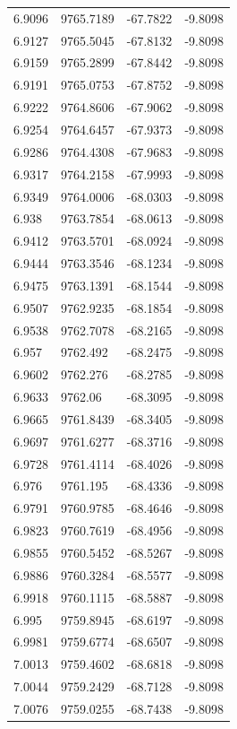 \begin{table}[H]
\begin{tabular}{llll}
6.9096 & 9765.7189 & -67.7822 & -9.8098 \\
6.9127 & 9765.5045 & -67.8132 & -9.8098 \\
6.9159 & 9765.2899 & -67.8442 & -9.8098 \\
6.9191 & 9765.0753 & -67.8752 & -9.8098 \\
6.9222 & 9764.8606 & -67.9062 & -9.8098 \\
6.9254 & 9764.6457 & -67.9373 & -9.8098 \\
6.9286 & 9764.4308 & -67.9683 & -9.8098 \\
6.9317 & 9764.2158 & -67.9993 & -9.8098 \\
6.9349 & 9764.0006 & -68.0303 & -9.8098 \\
6.938 & 9763.7854 & -68.0613 & -9.8098 \\
6.9412 & 9763.5701 & -68.0924 & -9.8098 \\
6.9444 & 9763.3546 & -68.1234 & -9.8098 \\
6.9475 & 9763.1391 & -68.1544 & -9.8098 \\
6.9507 & 9762.9235 & -68.1854 & -9.8098 \\
6.9538 & 9762.7078 & -68.2165 & -9.8098 \\
6.957 & 9762.492 & -68.2475 & -9.8098 \\
6.9602 & 9762.276 & -68.2785 & -9.8098 \\
6.9633 & 9762.06 & -68.3095 & -9.8098 \\
6.9665 & 9761.8439 & -68.3405 & -9.8098 \\
6.9697 & 9761.6277 & -68.3716 & -9.8098 \\
6.9728 & 9761.4114 & -68.4026 & -9.8098 \\
6.976 & 9761.195 & -68.4336 & -9.8098 \\
6.9791 & 9760.9785 & -68.4646 & -9.8098 \\
6.9823 & 9760.7619 & -68.4956 & -9.8098 \\
6.9855 & 9760.5452 & -68.5267 & -9.8098 \\
6.9886 & 9760.3284 & -68.5577 & -9.8098 \\
6.9918 & 9760.1115 & -68.5887 & -9.8098 \\
6.995 & 9759.8945 & -68.6197 & -9.8098 \\
6.9981 & 9759.6774 & -68.6507 & -9.8098 \\
7.0013 & 9759.4602 & -68.6818 & -9.8098 \\
7.0044 & 9759.2429 & -68.7128 & -9.8098 \\
7.0076 & 9759.0255 & -68.7438 & -9.8098 \\

\end{tabular}
\end{table}
